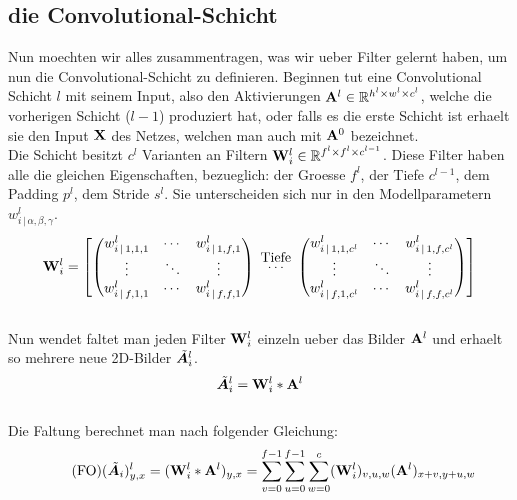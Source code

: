 \subsection{die Convolutional-Schicht}
Nun moechten wir alles zusammentragen, was wir ueber Filter gelernt
haben, um nun die Convolutional-Schicht zu definieren.
\para{}
Beginnen tut eine Convolutional Schicht $l$ mit seinem Input, also den
Aktivierungen $\mathbf{A}^l \in \mathbb{R}^{h^l \times w^l \times c^l}$, welche die vorherigen Schicht ($l-1$) produziert hat,
oder falls es die erste Schicht ist erhaelt sie den Input $\mathbf{X}$ des Netzes,
welchen man auch mit $\mathbf{A}^0$ bezeichnet. \\
Die Schicht besitzt $c^l$ Varianten an Filtern $\mathbf{W}^l_i \in
\mathbb{R}^{f^l \times f^l \times c^{l-1}}$. Diese Filter haben alle die gleichen
Eigenschaften, bezueglich: der Groesse $f^l$, der Tiefe $c^{l-1}$, dem Padding
$p^l$, dem Stride $s^l$. Sie unterscheiden sich nur in den Modellparametern
$w^l_{i\,|\,\alpha,\beta,\gamma}$.
\\
\begin{equation*}
  \ten{W}^l_i =
  \begin{bmatrix}
    \begin{pmatrix}
      w_{i\,|\,1,1,1}^l & \cdots & w_{i\,|\,1,f,1}^l \\
      \vdots & \ddots & \vdots \\
      w_{i\,|\,f,1,1}^l & \cdots & w_{i\,|\,f,f,1}^l
    \end{pmatrix}
    & \stackrel{\mathclap{\normalfont\mbox{Tiefe}}}{\cdots} &
    \begin{pmatrix}
      w_{i\,|\,1,1,c^l}^l & \cdots & w_{i\,|\,1,f,c^l}^l \\
      \vdots & \ddots & \vdots \\
      w_{i\,|\,f,1,c^l}^l & \cdots & w_{i\,|\,f,f,c^l}^l
    \end{pmatrix}
  \end{bmatrix}
\end{equation*}
\\
Nun wendet faltet man jeden Filter $\mathbf{W}_i^l$ einzeln ueber das Bilder
$\mathbf{A}^l$ und erhaelt so mehrere neue 2D-Bilder $\tilde{\bm{A}}_i^l$.
\\
\begin{equation}
  \tilde{\bm{A}}_i^l = \mathbf{W}_i^l * \mathbf{A}^l
\end{equation}
\\
Die Faltung berechnet man nach folgender Gleichung:
\\
\begin{equation}\tag{FO}
  (\tilde{\bm{A}}_i)_{y,x}^l = (\mathbf{W}_i^l * \mathbf{A}^l)_{y,x} = \sum_{v=0}^{f-1} \sum_{u=0}^{f-1} \sum_{w=0}^c (\mathbf{W}^l_i)_{v,u,w} (\mathbf{A}^l)_{x+v,y+u,w}
\end{equation}
